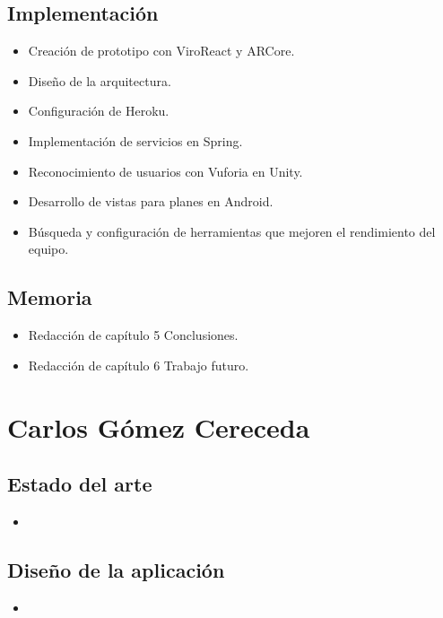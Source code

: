     \subsection{Implementación}
    \label{makereference7.2.3}
        \begin{itemize}
            \item Creación de prototipo con ViroReact y ARCore.
            \item Diseño de la arquitectura.
            \item Configuración de Heroku.
            \item Implementación de servicios en Spring.
            \item Reconocimiento de usuarios con Vuforia en Unity.
            \item Desarrollo de vistas para planes en Android.
            \item Búsqueda y configuración de herramientas que mejoren el
             rendimiento del equipo.
        \end{itemize}
    \subsection{Memoria}
    \label{makereference7.2.3}
        \begin{itemize}
            \item Redacción de capítulo 5 Conclusiones.
            \item Redacción de capítulo 6 Trabajo futuro.
        \end{itemize}

\section{Carlos Gómez Cereceda}
\label{makereference7.3}
    \subsection{Estado del arte}
    \label{makereference7.3.1}
        \begin{itemize}
            \item
        \end{itemize}
    \subsection{Diseño de la aplicación}
    \label{makereference7.3.2}
        \begin{itemize}
            \item
        \end{itemize}
